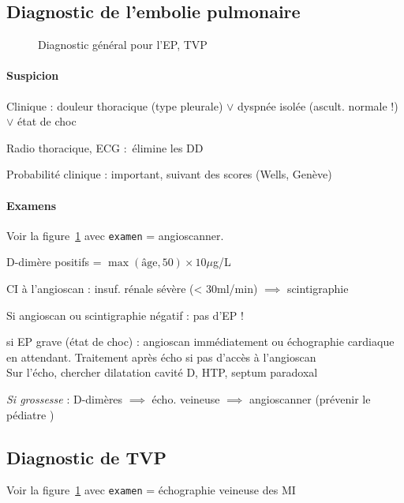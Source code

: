 \documentclass{article}
\begin{document}
\subsection{Diagnostic de l'embolie pulmonaire}
\begin{figure}[htpb]
  \centering
  \caption{Diagnostic général pour l'EP, TVP}
  \label{fig:ep-diag}
\end{figure}


\paragraph{Suspicion}
Clinique : douleur thoracique (type pleurale) $\vee$ dyspnée isolée (ascult.
normale !) $\vee$ état de choc

Radio thoracique, ECG : élimine les DD

Probabilité clinique : important, suivant des scores (Wells, Genève)

\paragraph{Examens}
Voir la figure~\ref{fig:ep-diag} avec \texttt{examen} = angioscanner.

D-dimère positifs = $\max(\text{âge}, 50) \times 10 \mu{}$g/L

CI à l'angioscan : insuf. rénale sévère (< 30ml/min) $\implies$ scintigraphie

Si angioscan ou scintigraphie négatif : pas d'EP !

\danger{} si EP grave (état de choc) : angioscan immédiatement ou échographie
cardiaque en attendant. Traitement après écho si pas d'accès à l'angioscan
\skull\\
Sur l'écho, chercher dilatation cavité D, HTP, septum paradoxal

\textit{Si grossesse}  : D-dimères $\implies$ écho. veineuse $\implies$ angioscanner
(prévenir le pédiatre \skull)

\subsection{Diagnostic de TVP}
Voir la figure~\ref{fig:ep-diag} avec \texttt{examen} = échographie veineuse
des MI
\end{document}
